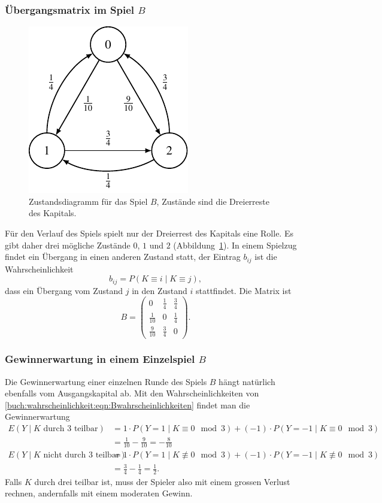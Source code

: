 \subsubsection{Übergangsmatrix im Spiel $B$}
\begin{figure}
\centering
\includegraphics{chapters/80-wahrscheinlichkeit/images/spielB.pdf}
\caption{Zustandsdiagramm für das Spiel $B$, Zustände sind die
Dreierreste des Kapitals.
\label{buch:wahrscheinlichkeit:fig:spielB}}
\end{figure}%
Für den Verlauf des Spiels spielt nur der Dreierrest des Kapitals
eine Rolle.
Es gibt daher drei mögliche Zustände $0$, $1$ und $2$
(Abbildung~\ref{buch:wahrscheinlichkeit:fig:spielB}).
In einem Spielzug findet ein Übergang in einen anderen Zustand
statt, der Eintrag $b_{ij}$ ist die Wahrscheinlichkeit
\[
b_{ij}
=
P(K\equiv i\mid K\equiv j),
\]
dass ein Übergang vom Zustand $j$ in den Zustand $i$ stattfindet.
Die Matrix ist
\[
B=
\begin{pmatrix}
0          &\frac14 &\frac34\\
\frac1{10} &0       &\frac14\\
\frac9{10} &\frac34 &0
\end{pmatrix}.
\]

\subsubsection{Gewinnerwartung in einem Einzelspiel $B$}
Die Gewinnerwartung einer einzelnen Runde des Spiels $B$ hängt natürlich
ebenfalls vom Ausgangskapital ab.
Mit den Wahrscheinlichkeiten von 
\eqref{buch:wahrscheinlichkeit:eqn:Bwahrscheinlichkeiten}
findet man die Gewinnerwartung
\begin{equation}
\begin{aligned}
E(Y\mid \text{$K$ durch $3$ teilbar})
&=
1\cdot P(Y=1\mid K\equiv 0\mod 3)
+
(-1)\cdot P(Y=-1\mid K\equiv 0\mod 3)
\\
&=
\frac1{10}
-
\frac{9}{10}
=
-\frac{8}{10}
\\
E(Y\mid \text{$K$ nicht durch $3$ teilbar})
&=
1\cdot P(Y=1\mid K\not\equiv 0\mod 3)
+
(-1)\cdot P(Y=-1\mid K\not\equiv 0\mod 3)
\\
&=
\frac34-\frac14
=
\frac12.
\end{aligned}
\label{buch:wahrscheinlichkeit:eqn:Berwartungen}
\end{equation}
Falls $K$ durch drei teilbar ist, muss der Spieler
also mit einem grossen Verlust rechnen, andernfalls mit einem
moderaten Gewinn.

